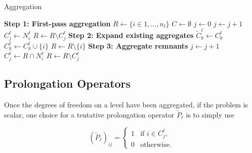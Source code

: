 \begin{algorithm}
	\caption{Aggregation}\label{alg:aggregation}
	\begin{algorithmic}[1]
			\Statex \textbf{Step 1: First-pass aggregation}
			\State $R \gets \{ i \in 1, \ldots, n_l\}$ 
			\State $C \gets \emptyset$ 
			\State $j \gets 0$ 
					\State $j \gets j+1$
					\State $C_j^\ell \gets N_i^\ell$ 
					\State $R \gets R \setminus C_j^\ell$ 
				\EndIf
			\EndFor {}
			\Statex
			\Statex \textbf{Step 2: Expand existing aggregates}
				\State $\tilde{C}_k^\ell \gets C_k^\ell$
			\EndFor
			 
				 
					\State $C_k^\ell \gets C_k^\ell \cup \{ i \}$ 
					\State $R \gets R \setminus \{ i \} $
				\EndIf
			\EndFor
			\Statex
			\Statex \textbf{Step 3: Aggregate remnants}
			 
				\State $j \gets j + 1$
				\State $C_j^\ell \gets R \cap N_i^\ell$ 
				\State $R \gets R \setminus C_j^\ell$
			\EndFor
		\EndProcedure
	\end{algorithmic}
\end{algorithm}

\subsection{Prolongation Operators}

Once the degrees of freedom on a level have been aggregated, if the problem is scalar, one choice for a tentative prolongation operator $\tilde{P}_\ell$ is to simply use

\begin{equation}
	\left(\tilde P_\ell \right)_{ij} =
	\begin{cases}
		1 & \text{if $i \in C_j^\ell$}, \\
		0 & \text{otherwise}.
	\end{cases}
\end{equation}

